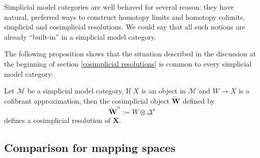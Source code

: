 Simplicial model categories are well behaved for several reason: they have natural, preferred ways to construct homotopy limits and homotopy colimits, simplicial and cosimplicial resolutions. We could say that all such notions are already ``built-in'' in a simplicial model category.

The following proposition shows that the situation described in the discussion at the beginning of section \ref{cosimplicial resolutions} is common to every simplicial model category:

\begin{prop} \label{prop simplicial resolutions simplicial category}
Let $\mathcal M$ be a simplicial model category. If $X$ is an object in $\mathcal M$ and $W \to X$ is a cofibrant approximation, then the cosimplicial object $\widetilde{\mathbf W}$ defined by
\[
\widetilde{\mathbf W}^n := W \otimes \Delta^n
\]
defines a cosimplicial resolution of $\mathbf X$.
\end{prop}

\subsection{Comparison for mapping spaces}
